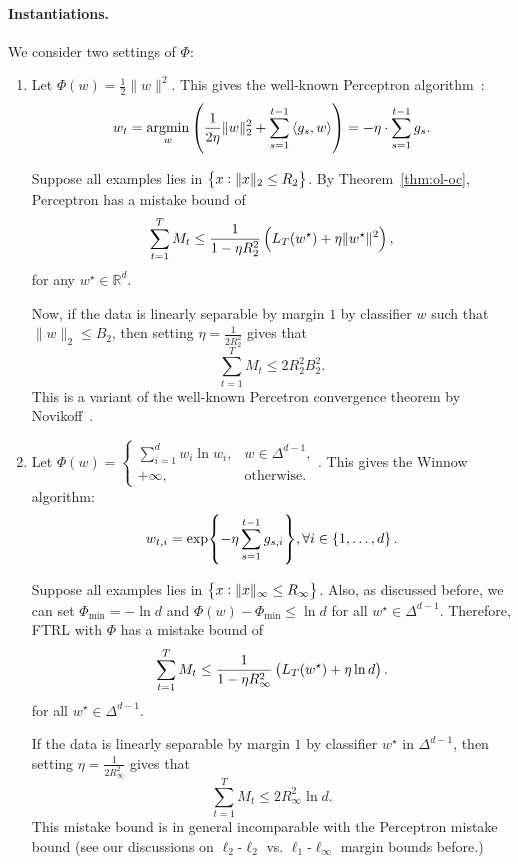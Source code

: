 \documentclass{article}
\DeclareMathOperator*{\argmin}{{\rm argmin}}
\newcommand{\RR}{\mathbb{R}} %
\newcommand{\inner}[2]{\left\langle #1,#2 \right\rangle}
\begin{document}
\paragraph{Instantiations.} We consider two settings of $\Phi$:
\begin{enumerate}
\item Let $\Phi(w) = \frac{1}{2}\|w\|^2$. This gives the well-known Perceptron algorithm~\cite{rosenblatt1958perceptron}:
\[ w_t = \argmin_{w} \del{ \frac{1}{2\eta}\| w \|_2^2 + \sum_{s=1}^{t-1} \inner{g_s}{w}} = -\eta \cdot \sum_{s=1}^{t-1} g_s. \]

Suppose all examples lies in $\cbr{x: \|x\|_2 \leq R_2}$.
By Theorem~\ref{thm:ol-oc}, Perceptron has a mistake bound of
\[ \sum_{t=1}^T M_t \leq \frac{1}{1-\eta R_2^2}\del{L_T(w^\star) + \eta\| w^\star \|^2}, \]
for any $w^\star \in \RR^d$.

Now, if the data is linearly separable by margin $1$ by classifier $w$ such that $\| w \|_2 \leq B_2$, then setting $\eta = \frac{1}{2R_2^2}$ gives that
\[ \sum_{t=1}^T M_t \leq 2 R_2^2 B_2^2. \]
This is a variant of the well-known Percetron convergence theorem by Novikoff~\cite{rosenblatt1958perceptron}.

\item Let $\Phi(w) = \begin{cases} \sum_{i=1}^d w_i \ln w_i, & w \in \Delta^{d-1}, \\ +\infty, & \text{otherwise}. \end{cases}$. This gives the  Winnow~\cite{littlestone1988learning} algorithm:
\[ w_{t,i} = \exp{-\eta \sum_{s=1}^{t-1} g_{s,i}}, \forall i \in \cbr{1,\ldots,d}. \]

Suppose all examples lies in $\cbr{x: \|x\|_\infty \leq R_\infty}$. Also, as discussed before, we can set $\Phi_{\min} = -\ln d$ and $\Phi(w) - \Phi_{\min} \leq \ln d$ for all $w^\star \in \Delta^{d-1}$. Therefore,
FTRL with $\Phi$ has a mistake bound of
\[ \sum_{t=1}^T M_t \leq \frac{1}{1-\eta R_\infty^2}\del{L_T(w^\star) + \eta \ln d}. \]
for all $w^\star \in \Delta^{d-1}$.

If the data is linearly separable by margin $1$ by classifier $w^\star$ in $\Delta^{d-1}$, then setting $\eta = \frac{1}{2R_\infty^2}$ gives that
\[ \sum_{t=1}^T M_t \leq 2 R_\infty^2 \ln d. \]
This mistake bound is in general incomparable with the Perceptron mistake bound (see our discussions on $\ell_2$-$\ell_2$ vs. $\ell_1$-$\ell_\infty$ margin bounds before.)
\end{enumerate}
\end{document}
